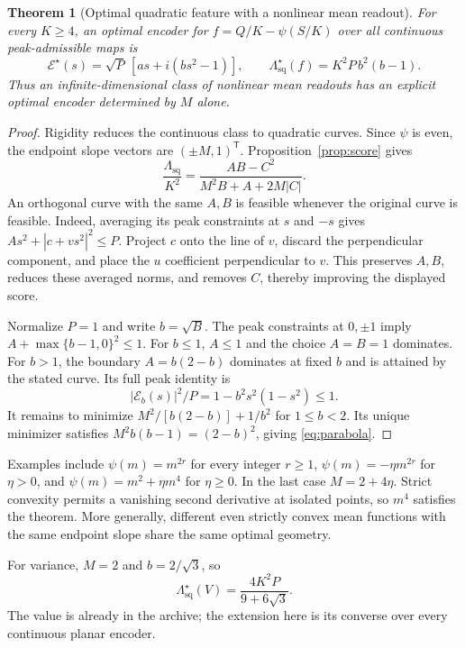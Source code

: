 \documentclass[11pt,letterpaper]{article}
\newtheorem{theorem}{Theorem}
\theoremstyle{remark}
\newcommand{\enc}{\mathscr E}
\newcommand{\sq}{\mathrm{sq}}
\newcommand{\T}{\mathsf T}
\begin{document}
\begin{theorem}[Optimal quadratic feature with a nonlinear mean readout]
\label{thm:parabola}
For every $K\ge4$, an optimal encoder for $f=Q/K-\psi(S/K)$ over all continuous peak-admissible maps is
\begin{equation}
 \boxed{\enc^\star(s)=\sqrt P\,[a s+i(bs^2-1)]},
 \qquad
 \boxed{\Lambda_{\sq}^\star(f)=K^2P\,b^2(b-1)}.
 \label{eq:parabola}
\end{equation}
Thus an infinite-dimensional class of nonlinear mean readouts has an explicit optimal encoder determined by $M$ alone.
\end{theorem}
\begin{proof}
Rigidity reduces the continuous class to quadratic curves. Since $\psi$ is even, the endpoint slope vectors are $(\pm M,1)^\T$. Proposition~\ref{prop:score} gives
$$
 \frac{\Lambda_{\sq}}{K^2}
 =\frac{AB-C^2}{M^2B+A+2M|C|}.
$$
An orthogonal curve with the same $A,B$ is feasible whenever the original curve is feasible. Indeed, averaging its peak constraints at $s$ and $-s$ gives $A s^2+|c+v s^2|^2\le P$. Project $c$ onto the line of $v$, discard the perpendicular component, and place the $u$ coefficient perpendicular to $v$. This preserves $A,B$, reduces these averaged norms, and removes $C$, thereby improving the displayed score.

Normalize $P=1$ and write $b=\sqrt B$. The peak constraints at $0,\pm1$ imply $A+\max\{b-1,0\}^2\le1$. For $b\le1$, $A\le1$ and the choice $A=B=1$ dominates. For $b>1$, the boundary $A=b(2-b)$ dominates at fixed $b$ and is attained by the stated curve. Its full peak identity is
$$
 |\enc_b(s)|^2/P=1-b^2s^2(1-s^2)\le1.
$$
It remains to minimize $M^2/[b(2-b)]+1/b^2$ for $1\le b<2$. Its unique minimizer satisfies $M^2b(b-1)=(2-b)^2$, giving \eqref{eq:parabola}.
\end{proof}

Examples include $\psi(m)=m^{2r}$ for every integer $r\ge1$, $\psi(m)=-\eta m^{2r}$ for $\eta>0$, and $\psi(m)=m^2+\eta m^4$ for $\eta\ge0$. In the last case $M=2+4\eta$. Strict convexity permits a vanishing second derivative at isolated points, so $m^4$ satisfies the theorem. More generally, different even strictly convex mean functions with the same endpoint slope share the same optimal geometry.

For variance, $M=2$ and $b=2/\sqrt3$, so
$$
 \Lambda_{\sq}^\star(V)=\frac{4K^2P}{9+6\sqrt3}.
$$
The value is already in the archive; the extension here is its converse over every continuous planar encoder.
\end{document}
